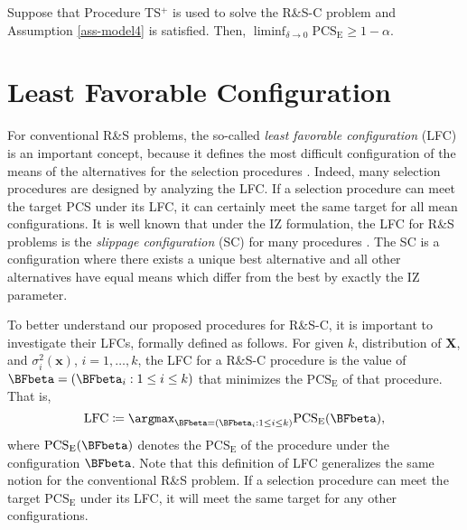 \documentclass[ijoc,nonblindrev]{informs3}
\def\bx{{\bm x}}
\def\bX{{\bm X}}
\def\PCSE{\mathrm{PCS}_{\mathrm{E}}}
\begin{document}
\begin{theorem} \label{thm-het-asy}
Suppose that Procedure TS$^+$ is used to solve the R\&S-C problem and Assumption \ref{ass-model4} is satisfied. Then,
$\liminf_{\delta \to  0} \PCSE \geq 1-\alpha$.
\end{theorem}



\section{Least Favorable Configuration} \label{sec-LFC}


For conventional R\&S problems, the so-called \textit{least favorable configuration} (LFC) is an important concept, because it defines the most difficult configuration of the means of the alternatives for the selection procedures \citep{Bechhofer54}.
Indeed, many selection procedures are designed by analyzing the LFC.
If a selection procedure can meet the target PCS under its LFC, it can certainly meet the same target for all mean configurations.
It is well known that under the IZ formulation, the LFC for R\&S problems is the \textit{slippage configuration} (SC) for many procedures \citep{gupta1982}.
The SC is a configuration where there exists a unique best alternative and all other alternatives have equal means which differ from the best by exactly the IZ parameter.

To better understand our proposed procedures for R\&S-C, it is important to investigate their LFCs,
formally defined as follows.
For given $k$, distribution of $\bX$, and $\sigma_i^2(\bx)$, $i=1,\ldots,k$,
the LFC for a R\&S-C procedure is the value of $\BFbeta=(\BFbeta_i:1\leq i \leq k)$ that minimizes the $\PCSE$ of that procedure.
That is,
$$\text{LFC} \coloneqq \argmax_{\BFbeta=(\BFbeta_i:1\leq i \leq k)} \PCSE(\BFbeta),$$
where $\PCSE(\BFbeta)$ denotes the $\PCSE$ of the procedure under the configuration $\BFbeta$.
Note that this definition of LFC generalizes the same notion for the conventional R\&S problem.
If a selection procedure can meet the target $\PCSE$ under its LFC, it will meet the same target for any other configurations.
\end{document}
